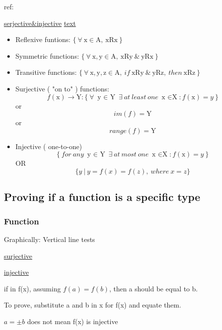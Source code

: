\documentclass[openany]{book}
\begin{document}
ref:

\href{https://www.khanacademy.org/math/linear-algebra/matrix-transformations/inverse-transformations/v/surjective-onto-and-injective-one-to-one-functions}{serjective\&injective}
\href{URL}{text}

\begin{itemize}

	\item Reflexive funtions: $ \{ \  \forall \ \mathrm{x} \in \mathrm{A}, \  \mathrm{xRx} \ \} $
	\item Symmetric functions: $ \{ \ \forall \ \mathrm{x,y} \in \mathrm{A}, \  \mathrm{xRy} \  \& \ \mathrm{yRx} \ \} $
	\item Transitive functions: $ \{ \ \forall \ \mathrm{x,y,z} \in \mathrm{A},\ if\ \mathrm{xRy} \  \& \ \mathrm{yRz},\ then\   \mathrm{xRz}\ \} $
	\item Surjective ( "on to" ) functions:  \[ f(\mathrm{x})\rightarrow \mathrm{Y}:\{\ \forall\  \text{y $\in$ Y}\ \exists\ at\ least\ one\ \text{x $\in$X}: f(\mathrm{x})=y\  \} \] or
	      \[ im(f)=\mathrm{Y}\]
	      or
	      \[ range(f)=\mathrm{Y}\]
	\item Injective ( one-to-one)
	      \[ \{\ for\ any\   \text{y $\in$ Y}\ \exists\ at\ most\ one\ \text{x $\in$X}: f(\mathrm{x})=y\  \} \]
	      OR
	      \[ \{ y\ |\ y=f(x)=f(z),\ where\ x=z \} \]
	      
	      
\end{itemize}

\subsection{Proving if a function is a specific type}

\subsubsection{Function}

Graphically:
Vertical line tests

\href{https://www.youtube.com/watch?v=Uzlj6N5OYcM}{surjective}


\href{https://www.youtube.com/watch?v=bjATxNZp4GI}{injective}

if in f(x), assuming \( f(a) = f (b) \), then a should be equal to b.

To prove, substitute a and b in x for f(x) and equate them.

\( a=\pm b\) does not mean f(x) is injective
\end{document}
